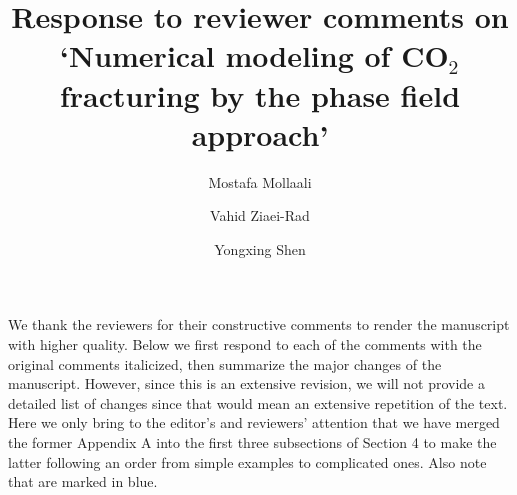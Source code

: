 \documentclass{elsarticle}
\begin{document}
\begin{frontmatter}



\title{Response to reviewer comments on `Numerical modeling of CO$_2$ fracturing by the phase field approach'}


\author[mymainaddress]{Mostafa Mollaali}

\author[mysecondaryaddress]{Vahid Ziaei-Rad}

\author[mymainaddress]{Yongxing Shen}

\address[mymainaddress]{University of Michigan -- Shanghai Jiao Tong University Joint Institute, Shanghai Jiao Tong University,	Shanghai, China}
\address[mysecondaryaddress]{Faculty of Civil, Water and Environmental Engineering, Shahid Beheshti University, Tehran, Iran}
\end{frontmatter}


We thank the reviewers for their constructive comments to render the manuscript with higher quality. Below we first respond to each of the comments with the original comments italicized, then summarize the major changes of the manuscript. However, since this is an extensive revision, we will not provide a detailed list of changes since that would mean an extensive repetition of the text. Here we only bring to the editor's and reviewers' attention that we have merged the former Appendix A into the first three subsections of Section 4 to make the latter following an order from simple examples to complicated ones. Also note that  are marked in blue.
\end{document}

